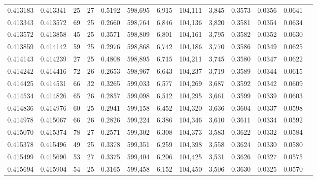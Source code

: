\begin{tabular}{rrrrrrrrrrrrr}
0.413183 & 0.413341 &    25 &  27 &                                     0.5192 & 598,695 &   6,915 & 104,111 &   3,845 & 0.3573 & 0.0356 & 0.0641 \\
0.413343 & 0.413572 &    69 &  25 &                                     0.2660 & 598,764 &   6,846 & 104,136 &   3,820 & 0.3581 & 0.0354 & 0.0634 \\
0.413572 & 0.413858 &    45 &  25 &                                     0.3571 & 598,809 &   6,801 & 104,161 &   3,795 & 0.3582 & 0.0352 & 0.0630 \\
0.413859 & 0.414142 &    59 &  25 &                                     0.2976 & 598,868 &   6,742 & 104,186 &   3,770 & 0.3586 & 0.0349 & 0.0625 \\
0.414143 & 0.414239 &    27 &  25 &                                     0.4808 & 598,895 &   6,715 & 104,211 &   3,745 & 0.3580 & 0.0347 & 0.0622 \\
0.414242 & 0.414416 &    72 &  26 &                                     0.2653 & 598,967 &   6,643 & 104,237 &   3,719 & 0.3589 & 0.0344 & 0.0615 \\
0.414425 & 0.414531 &    66 &  32 &                                     0.3265 & 599,033 &   6,577 & 104,269 &   3,687 & 0.3592 & 0.0342 & 0.0609 \\
0.414534 & 0.414826 &    65 &  26 &                                     0.2857 & 599,098 &   6,512 & 104,295 &   3,661 & 0.3599 & 0.0339 & 0.0603 \\
0.414836 & 0.414976 &    60 &  25 &                                     0.2941 & 599,158 &   6,452 & 104,320 &   3,636 & 0.3604 & 0.0337 & 0.0598 \\
0.414978 & 0.415067 &    66 &  26 &                                     0.2826 & 599,224 &   6,386 & 104,346 &   3,610 & 0.3611 & 0.0334 & 0.0592 \\
0.415070 & 0.415374 &    78 &  27 &                                     0.2571 & 599,302 &   6,308 & 104,373 &   3,583 & 0.3622 & 0.0332 & 0.0584 \\
0.415378 & 0.415496 &    49 &  25 &                                     0.3378 & 599,351 &   6,259 & 104,398 &   3,558 & 0.3624 & 0.0330 & 0.0580 \\
0.415499 & 0.415690 &    53 &  27 &                                     0.3375 & 599,404 &   6,206 & 104,425 &   3,531 & 0.3626 & 0.0327 & 0.0575 \\
0.415694 & 0.415904 &    54 &  25 &                                     0.3165 & 599,458 &   6,152 & 104,450 &   3,506 & 0.3630 & 0.0325 & 0.0570 \\

\end{tabular}
